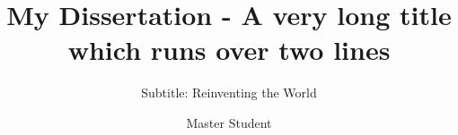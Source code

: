 \documentclass[mscthesis]{usiinfthesis}
\title{My Dissertation - A very long title\\ which runs over two
  lines} %
\subtitle{Subtitle: Reinventing the World} %
\author{Master Student} %
\begin{document}
\maketitle %
\frontmatter %
\lipsum

\begin{acknowledgements}
\lipsum 
\end{acknowledgements}

\tableofcontents 





% 






%
%
%
%
\printbibliography
\end{document}
